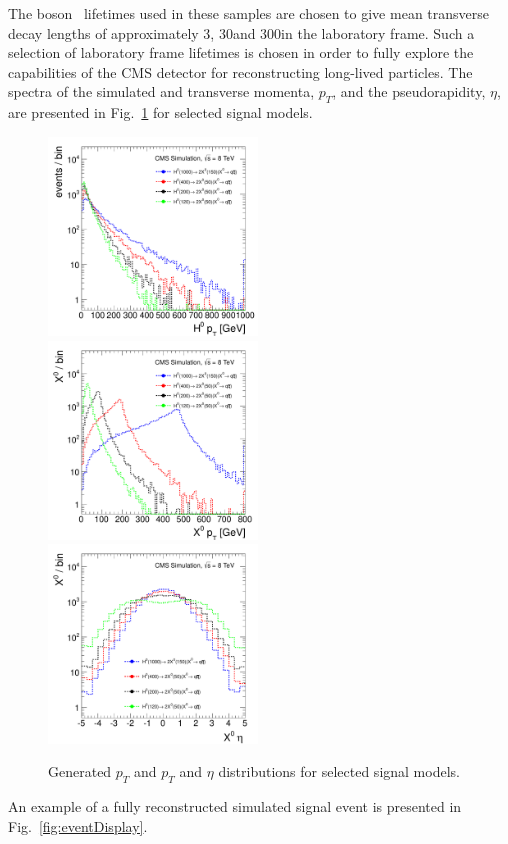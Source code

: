  The
\X boson ~lifetimes used in these samples are chosen to give mean transverse decay lengths of approximately
3\cm, 30\cm and 300\cm in the laboratory frame. Such a selection of laboratory frame lifetimes is chosen in
order to fully explore the capabilities of the CMS detector for reconstructing long-lived particles.
The spectra of the simulated \Higgs and \X transverse momenta, $p_T$, 
and the \X pseudorapidity, $\eta$, are presented in Fig.~\ref{fig:sigHX} for selected
signal models.
\begin{figure}[htbp]
\centering
\includegraphics[width=0.495\textwidth]{plots/signal/hpt.pdf}
\includegraphics[width=0.495\textwidth]{plots/signal/xpt.pdf}
\includegraphics[width=0.495\textwidth]{plots/signal/xeta.pdf}
\caption{Generated \Higgs $p_T$ and \X $p_T$ and $\eta$ distributions for selected signal models.\label{fig:sigHX}}
\end{figure}
An example of a fully reconstructed
simulated signal event is presented in Fig.~\ref{fig:eventDisplay}.


